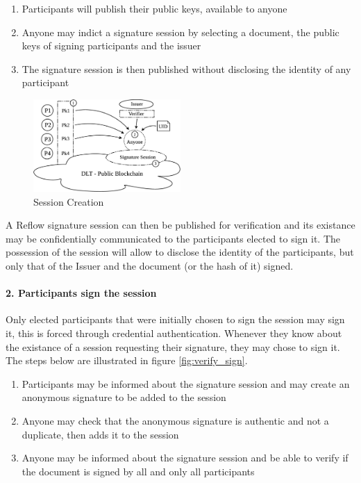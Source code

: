 \documentclass[twocolumn]{article}
\begin{document}
\begin{enumerate}
  \item Participants will publish their public keys, available to anyone 
  \item Anyone may indict a signature session by selecting a document, the public keys of signing participants and the issuer
  \item The signature session is then published without disclosing the identity of any participant
\end{enumerate}

\begin{figure}
  \caption{Session Creation}
  \label{fig:create_session}
  \centering
  \includegraphics[width=0.5\textwidth]{create_session.eps}
\end{figure}

A Reflow signature session can then be published for verification and its existance may be confidentially communicated to the participants elected to sign it. The possession of the session will allow to disclose the identity of the participants, but only that of the Issuer and the document (or the hash of it) signed.

\paragraph*{2. Participants sign the session}

Only elected participants that were initially chosen to sign the
session may sign it, this is forced through credential
authentication. Whenever they know about the existance of a session
requesting their signature, they may chose to sign it. The steps below
are illustrated in figure \ref{fig:verify_sign}.

\begin{enumerate}
  \item Participants may be informed about the signature session and
    may create an anonymous signature to be added to the session 
  \item Anyone may check that the anonymous signature is authentic
    and not a duplicate, then adds it to the session
  \item Anyone may be informed about the signature session and be able to verify if the document is signed by all and only all participants
\end{enumerate}
\end{document}
